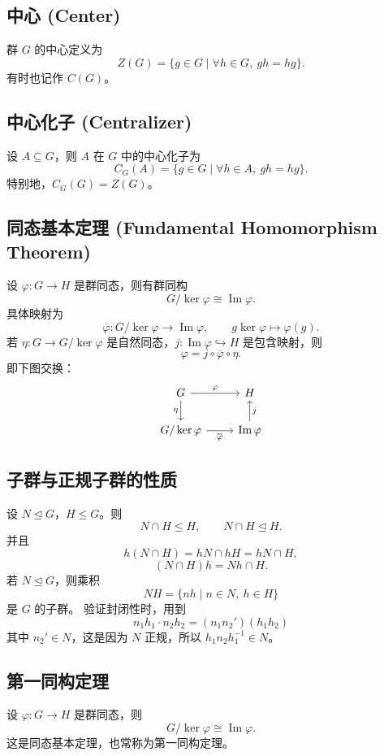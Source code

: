 \documentclass[12pt, a4paper]{article}
\begin{document}
\subsection*{中心 (Center)}
群 \(G\) 的中心定义为
\[
Z(G)=\{g\in G\mid \forall h\in G,\ gh=hg\}.
\]
有时也记作 \(C(G)\)。

\subsection*{中心化子 (Centralizer)}
设 \(A\subseteq G\)，则 \(A\) 在 \(G\) 中的中心化子为
\[
C_G(A)=\{g\in G\mid \forall h\in A,\ gh=hg\}.
\]
特别地，\(C_G(G)=Z(G)\)。

\subsection*{同态基本定理 (Fundamental Homomorphism Theorem)}
设 \(\varphi:G\to H\) 是群同态，则有群同构
\[
G/\ker\varphi \cong \operatorname{Im}\varphi.
\]
具体映射为
\[
\overline{\varphi}:G/\ker\varphi \to \operatorname{Im}\varphi,\qquad
g\ker\varphi \mapsto \varphi(g).
\]
若 \(\eta:G\to G/\ker\varphi\) 是自然同态，\(j:\operatorname{Im}\varphi\hookrightarrow H\) 是包含映射，则
\[
\varphi=j\circ \overline{\varphi}\circ \eta.
\]
即下图交换：
\[
\begin{tikzcd}
G \arrow[r,"\varphi"] \arrow[d,"\eta"'] & H \\ %
G/\ker\varphi \arrow[r,"\overline{\varphi}"'] & \operatorname{Im}\varphi \arrow[u,"j"'] %
\end{tikzcd}
\]

\subsection*{子群与正规子群的性质}
设 \(N\trianglelefteq G\)，\(H\le G\)。则
\[
N\cap H\le H,\qquad N\cap H\trianglelefteq H.
\]
并且
\[
h(N\cap H)=hN\cap hH=hN\cap H,
\]
\[
(N\cap H)h=Nh\cap H.
\]
若 \(N\trianglelefteq G\)，则乘积
\[
NH=\{nh\mid n\in N,\ h\in H\}
\]
是 \(G\) 的子群。
验证封闭性时，用到
\[
n_1h_1\cdot n_2h_2
=
(n_1n_2')(h_1h_2)
\]
其中 \(n_2'\in N\)，这是因为 \(N\) 正规，所以 \(h_1n_2h_1^{-1}\in N\)。

\subsection*{第一同构定理}
设 \(\varphi:G\to H\) 是群同态，则
\[
G/\ker\varphi \cong \operatorname{Im}\varphi.
\]
这是同态基本定理，也常称为第一同构定理。
\end{document}
